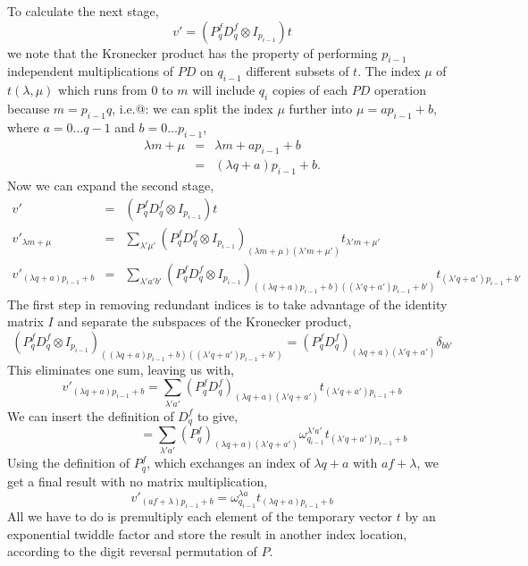\documentclass[fleqn,12pt]{article}
\begin{document}
To calculate the next stage,
%
\begin{equation}
v'=(P^f_q D^f_q \otimes I_{p_{i-1}}) t
\end{equation}
%
we note that the Kronecker product has the property of performing
$p_{i-1}$ independent multiplications of $PD$ on $q_{i-1}$ different
subsets of $t$. The index $\mu$ of $t(\lambda,\mu)$ which runs from 0
to $m$ will include $q_i$ copies of each $PD$ operation because
$m=p_{i-1}q$, i.e.@: we can split the index $\mu$ further into $\mu = a
p_{i-1} + b$, where $a = 0 \dots q-1$ and $b=0 \dots p_{i-1}$,
%
\begin{eqnarray}
\lambda m + \mu &=& \lambda m + a p_{i-1} + b \\
        &=& (\lambda q + a) p_{i-1} + b.
\end{eqnarray}
%
Now we can expand the second stage,
%
\begin{eqnarray}
v'&=& (P^f_q D^f_q \otimes I_{p_{i-1}}) t \\
v'_{\lambda m + \mu} &=& \sum_{\lambda' \mu'} 
 (P^f_q D^f_q \otimes I_{p_{i-1}})_{(\lambda m + \mu)(\lambda' m + \mu')}
        t_{\lambda' m + \mu'} \\
v'_{(\lambda q + a) p_{i-1} + b} &=& \sum_{\lambda' a' b'}
(
P^f_q D^f_q \otimes I_{p_{i-1}}
)_{((\lambda q+ a)p_{i-1} + b)((\lambda' q+ a')p_{i-1} + b')} 
t_{(\lambda' q + a')p_{i-1} +b'} 
\end{eqnarray}
%
The first step in removing redundant indices is to take advantage of
the identity matrix $I$ and separate the subspaces of the Kronecker
product,
%
\begin{equation}
(
P^f_q D^f_q \otimes I_{p_{i-1}}
)_{((\lambda q+ a)p_{i-1} + b)((\lambda' q+ a')p_{i-1} + b')} 
=
(P^f_q D^f_q)_{(\lambda q + a)(\lambda' q + a')}
\delta_{bb'}
\end{equation}
%
This eliminates one sum, leaving us with,
%
\begin{equation}
v'_{(\lambda q + a) p_{i-1} + b} 
= 
\sum_{\lambda' a' }
(P^f_q D^f_q)_{(\lambda q + a)(\lambda' q + a')} t_{(\lambda'q+a')p_{i-1} + b}
\end{equation}
%
We can insert the definition of $D^f_q$ to give,
%
\begin{equation}
\phantom{v'_{(\lambda q + a) p_{i-1} + b}}
= \sum_{\lambda'a'} (P^f_q)_{(\lambda q + a)(\lambda'q + a')} 
\omega^{\lambda'a'}_{q_{i-1}} t_{(\lambda'q+a')p_{i-1}+b}
\end{equation}
%
Using the definition of $P^f_q$, which exchanges an index of $\lambda
q + a$ with $a f + \lambda$, we get a final result with no matrix
multiplication,
%
\begin{equation}
v'_{(a f + \lambda) p_{i-1} + b}
= \omega^{\lambda a}_{q_{i-1}} t_{(\lambda q + a)p_{i-1} + b}
\end{equation}
%
All we have to do is premultiply each element of the temporary vector
$t$ by an exponential twiddle factor and store the result in another
index location, according to the digit reversal permutation of $P$.
\end{document}
